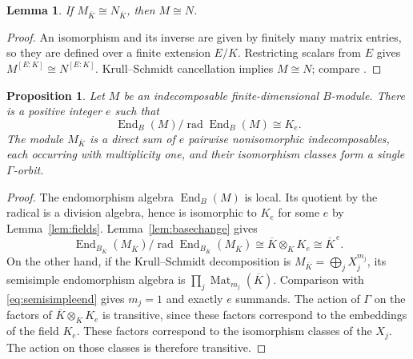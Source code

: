 \documentclass[11pt, reqno]{amsart}
\numberwithin{equation}{section}
\newtheorem{proposition}[theorem]{Proposition}
\newtheorem{lemma}[theorem]{Lemma}
\theoremstyle{definition}
\theoremstyle{remark}
\newcommand{\op}[1]{\operatorname{#1}}
\newcommand{\GG}{\Gamma}
\newcommand{\End}{\op{End}}
\newcommand{\rad}{\op{rad}}
\newcommand{\Kbar}{\overline K}
\newcommand{\iso}{\cong}
\begin{document}
\begin{lemma}\label{lem:ND}
If $M_{\Kbar}\iso N_{\Kbar}$, then $M\iso N$.
\end{lemma}
\begin{proof}
An isomorphism and its inverse are given by finitely many matrix entries,
so they are defined over a finite extension $E/K$. Restricting scalars
from $E$ gives $M^{[E:K]}\iso N^{[E:K]}$. Krull--Schmidt cancellation
implies $M\iso N$; compare \cite[Lemma~8.4.1]{DWbook}.
\end{proof}

\begin{proposition}\label{prop:geometric-orbit}
Let $M$ be an indecomposable finite-dimensional $B$-module. There is
a positive integer $e$ such that
\[ \End_B(M)/\rad\End_B(M)\iso K_e. \]
The module $M_{\Kbar}$ is a direct sum of $e$ pairwise nonisomorphic
indecomposables, each occurring with multiplicity one, and their
isomorphism classes form a single $\GG$-orbit.
\end{proposition}
\begin{proof}
The endomorphism algebra $\End_B(M)$ is local. Its quotient by the radical
is a division algebra, hence is isomorphic to $K_e$ for some $e$ by
Lemma~\ref{lem:fields}. Lemma~\ref{lem:basechange} gives
\begin{equation}\label{eq:semisimpleend} \End_{B_{\Kbar}}(M_{\Kbar})/\rad\End_{B_{\Kbar}}(M_{\Kbar}) \iso\Kbar\otimes_KK_e\iso\Kbar^{\,e}.\end{equation}
On the other hand, if the Krull--Schmidt decomposition is
$M_{\Kbar}=\bigoplus_j X_j^{m_j}$, its semisimple endomorphism algebra
is $\prod_j\op{Mat}_{m_j}(\Kbar)$. Comparison with
\eqref{eq:semisimpleend} gives $m_j=1$ and exactly $e$ summands.
The action of $\GG$ on the factors of $\Kbar\otimes_KK_e$ is
transitive, since these factors correspond to the embeddings of the
field $K_e$. These factors correspond to the isomorphism classes of the $X_j$.
The action on those classes is therefore transitive.
\end{proof}
\end{document}
